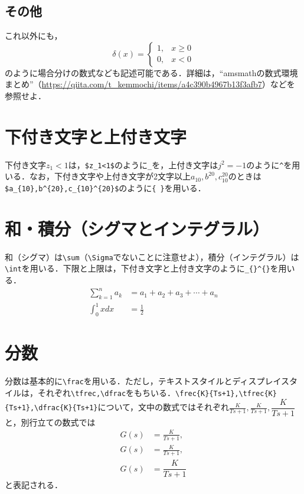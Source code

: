 \documentclass[11pt,a4paper]{jsarticle}
\begin{document}
\subsection{その他}

これ以外にも，
\begin{equation*}
  \delta(x) =
  \begin{cases}
    1, & x \geq 0 \\
    0, & x < 0
  \end{cases}
\end{equation*}
のように場合分けの数式なども記述可能である．詳細は，``amsmathの数式環境まとめ''（\url{https://qiita.com/t_kemmochi/items/a4c390b4967b13f3afb7}）などを参照せよ．

\section{下付き文字と上付き文字}

下付き文字$z_1<1$は，\verb|$z_1<1$|のように\verb|_|を，上付き文字は$j^2=-1$のように\verb|^|を用いる．なお，下付き文字や上付き文字が2文字以上$a_{10},b^{20},c_{10}^{20}$のときは\verb|$a_{10},b^{20},c_{10}^{20}$|のように\verb|{ }|を用いる．

\section{和・積分（シグマとインテグラル）}

和（シグマ）は\verb|\sum|（\verb|\Sigma|でないことに注意せよ），積分（インテグラル）は\verb|\int|を用いる．下限と上限は，下付き文字と上付き文字のように\verb|_{}^{}|を用いる．
\begin{align*}
  \sum_{k=1}^{n}a_k & =a_1+a_2+a_3+\cdots+a_n \\
  \int_0^1 x dx     & = \frac{1}{2}
\end{align*}

\section{分数}

分数は基本的に\verb|\frac|を用いる．ただし，テキストスタイルとディスプレイスタイルは，それぞれ\verb|\tfrec,\dfrac|をもちいる．\verb|\frec{K}{Ts+1},\tfrec{K}{Ts+1},\dfrac{K}{Ts+1}|について，文中の数式ではそれぞれ$\frac{K}{Ts+1},\tfrac{K}{Ts+1},\dfrac{K}{Ts+1}$と，別行立ての数式では
\begin{align*}
  G(s) & =\frac{K}{Ts+1},  \\
  G(s) & =\tfrac{K}{Ts+1}, \\
  G(s) & =\dfrac{K}{Ts+1}
\end{align*}
と表記される．
\end{document}
